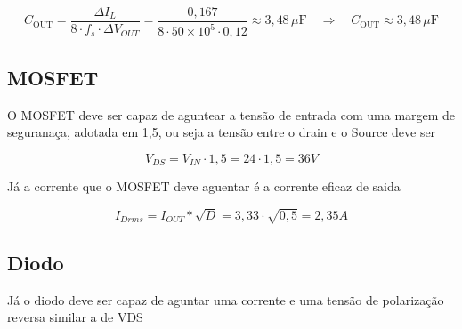 \begin{equation}
    C_{\mathrm{OUT}} =
    \frac{\Delta I_L}
    {8\cdot f_s \cdot \Delta V_{OUT}} =
    \frac{0{,}167}
    {8\cdot 50 \times 10^{5} \cdot 0{,}12}
    \approx 3{,}48\,\mu\mathrm{F}
    \quad\Rightarrow\quad
    \boxed{C_{\mathrm{OUT}} \approx 3{,}48\,\mu\mathrm{F}}
    \label{eq:valor-capacitancia}
\end{equation}

\subsection{MOSFET}

O MOSFET deve ser capaz de aguntear a tensão de entrada com uma margem de seguranaça, adotada em 1,5, ou seja a tensão entre o drain e o Source deve ser

\begin{equation}
    V_{DS}=V_{IN} \cdot 1,5 = 24 \cdot 1,5 = 36V
\end{equation}

Já a corrente que o MOSFET deve aguentar é a corrente eficaz de saida

\begin{equation}
    I_{Drms} = I_{OUT}*\sqrt{D}=3,33 \cdot \sqrt{0,5} = 2,35A
\end{equation}

\subsection{Diodo}

Já o diodo deve ser capaz de aguntar uma corrente e uma tensão de polarização reversa similar a de VDS

